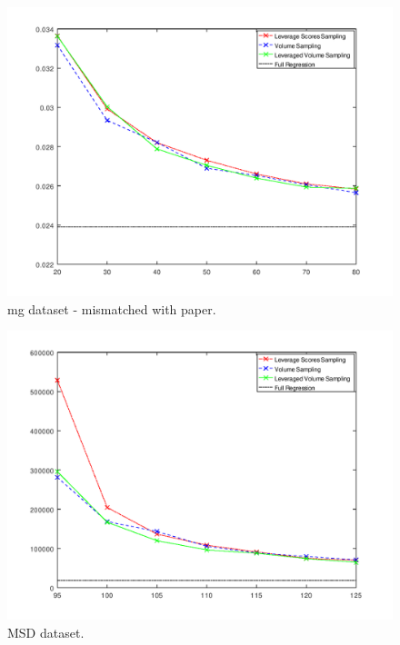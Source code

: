 \documentclass{article}
\begin{document}
        \begin{figure}
            \includegraphics[width=\linewidth]{results/mg.png}
            \caption{mg dataset - mismatched with paper.}
            \label{fig:dataset1}
        \end{figure}
        \begin{figure}
            \includegraphics[width=\linewidth]{results/YearPredictionMSD.png}
            \caption{MSD dataset.}
            \label{fig:dataset1}
        \end{figure}
\end{document}

